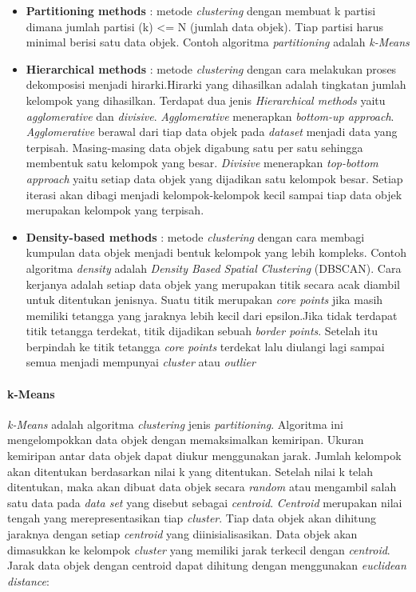 \documentclass[a4paper,twoside]{article}
\begin{document}
\begin{enumerate}
\begin{itemize}
\item \textbf{Partitioning methods} : metode \textit{clustering} dengan membuat k partisi dimana jumlah partisi (k) <= N (jumlah data objek). Tiap partisi harus minimal berisi satu data objek. Contoh algoritma \textit{partitioning} adalah \textit{k-Means} 

\item \textbf{Hierarchical methods} : metode \textit{clustering} dengan cara melakukan proses dekomposisi menjadi hirarki.Hirarki yang dihasilkan adalah tingkatan jumlah kelompok yang dihasilkan. Terdapat dua jenis \textit{Hierarchical methods} yaitu \textit{agglomerative} dan \textit{divisive}. \textit{Agglomerative} menerapkan \textit{bottom-up approach}. \textit{Agglomerative} berawal dari tiap data objek pada \textit{dataset} menjadi data yang terpisah. Masing-masing data objek digabung satu per satu sehingga membentuk satu kelompok yang besar. \textit{Divisive} menerapkan \textit{top-bottom approach} yaitu setiap data objek yang dijadikan satu kelompok besar. Setiap iterasi akan dibagi menjadi kelompok-kelompok kecil sampai tiap data objek merupakan kelompok yang terpisah.

\item \textbf{Density-based methods} : metode \textit{clustering} dengan cara membagi kumpulan data objek menjadi bentuk kelompok yang lebih kompleks. Contoh algoritma \textit{density} adalah \textit{Density Based Spatial Clustering} (DBSCAN). Cara kerjanya adalah setiap data objek yang merupakan titik secara acak diambil  untuk ditentukan jenisnya. Suatu titik merupakan \textit{core points} jika masih memiliki tetangga yang jaraknya lebih kecil dari epsilon.Jika tidak terdapat titik tetangga terdekat, titik dijadikan sebuah \textit{border points}. Setelah itu berpindah ke titik tetangga \textit{core points} terdekat lalu diulangi lagi sampai semua menjadi mempunyai \textit{cluster} atau \textit{outlier}
\end{itemize}

\paragraph{k-Means}
\textit{k-Means} adalah algoritma \textit{clustering} jenis \textit{partitioning}. Algoritma ini mengelompokkan data objek dengan memaksimalkan kemiripan. Ukuran kemiripan antar data objek dapat diukur menggunakan jarak. Jumlah kelompok akan ditentukan berdasarkan nilai k yang ditentukan. Setelah nilai k telah ditentukan, maka akan dibuat data objek secara \textit{random} atau mengambil salah satu data pada \textit{data set} yang disebut sebagai \textit{centroid}. \textit{Centroid} merupakan nilai tengah yang merepresentasikan tiap \textit{cluster}. Tiap data objek akan dihitung jaraknya dengan setiap \textit{centroid} yang diinisialisasikan. Data objek akan dimasukkan ke kelompok \textit{cluster} yang memiliki jarak terkecil dengan \textit{centroid}. Jarak data objek dengan centroid dapat dihitung dengan menggunakan \textit{euclidean distance}: 


\end{enumerate}
\end{document}
